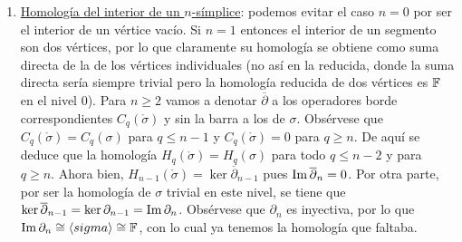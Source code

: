 \documentclass[HS.tex]{subfiles}
\begin{document}
\begin{nota}
\begin{enumerate}
\item \underline{Homología del interior de un $n$-símplice}: podemos evitar el caso $n=0$ por ser el interior de un vértice vacío. Si $n=1$ entonces el interior de un segmento son dos vértices, por lo que claramente su homología se obtiene como suma directa de la de los vértices individuales (no así en la reducida, donde la suma directa sería siempre trivial pero la homología reducida de dos vértices es $\mathbb{F}$ en el nivel 0). Para $n\geq 2$ vamos a denotar $\overline{\partial}$ a los operadores borde correspondientes $C_q(\mathring{\sigma})$ y sin la barra a los de $\sigma$. Obsérvese que $C_q(\mathring{\sigma})=C_q(\sigma)$ para $q\leq n-1$ y $C_q(\mathring{\sigma})=0$ para $q\geq n$. De aquí se deduce que la homología $H_q(\mathring{\sigma})=H_q(\sigma)$ para todo $q\leq n-2$ y para $q\geq n$. Ahora bien, $H_{n-1}(\mathring{\sigma})=\ker\overline{\partial}_{n-1}$ pues $\operatorname{Im}\overline{\partial}_n=0$. Por otra parte, por ser la homología de $\sigma$ trivial en este nivel, se tiene que $\ker\overline{\partial}_{n-1}=\ker\partial_{n-1}=\operatorname{Im}\partial_n$. Obsérvese que $\partial_n$ es inyectiva, por lo que $\operatorname{Im}\partial_n\cong \langle{sigma}\rangle\cong\mathbb{F}$, con lo cual ya tenemos la homología que faltaba. 
\end{enumerate}
\end{nota}
\end{document}
